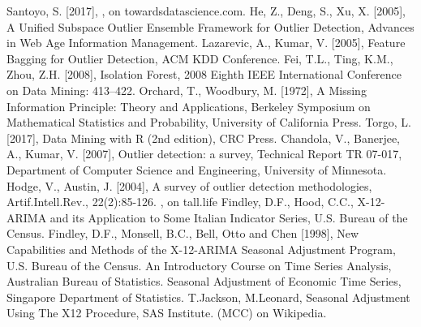 \begin{thebibliography}{99}
 Santoyo, S. [2017], , on towardsdatascience.com.
 He, Z., Deng, S., Xu, X. [2005], A Unified Subspace Outlier Ensemble Framework for Outlier Detection, Advances in Web Age Information Management.
 Lazarevic, A., Kumar, V. [2005], Feature Bagging for Outlier Detection, ACM KDD Conference.
 Fei, T.L., Ting, K.M., Zhou, Z.H. [2008], Isolation Forest, 2008 Eighth IEEE International Conference on Data Mining: 413–422.
 Orchard, T., Woodbury, M. [1972], A Missing Information Principle: Theory and Applications, Berkeley Symposium on Mathematical Statistics and Probability, University of California Press.  
 Torgo, L. [2017], Data Mining with R (2nd edition), CRC Press.
 Chandola, V., Banerjee, A., Kumar, V. [2007], Outlier detection: a survey, Technical Report TR 07-017, Department of Computer Science and Engineering, University of Minnesota.
 Hodge, V., Austin, J. [2004], A survey of outlier detection methodologies, Artif.Intell.Rev., 22(2):85-126.
 , on tall.life 
 Findley, D.F., Hood, C.C., X-12-ARIMA and its Application to Some Italian Indicator Series,  U.S. Bureau of the Census.
 Findley, D.F., Monsell, B.C., Bell, Otto and Chen [1998], New Capabilities and Methods of the X-12-ARIMA Seasonal Adjustment Program, U.S. Bureau of the Census. 
 An Introductory Course on Time Series Analysis, Australian Bureau of Statistics. 
 Seasonal Adjustment of Economic Time Series, Singapore Department of Statistics.
 T.Jackson, M.Leonard, Seasonal Adjustment Using The X12 Procedure, SAS Institute.
  (MCC) on Wikipedia.
\end{thebibliography}







